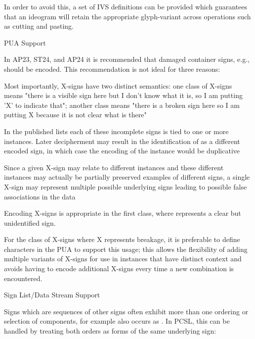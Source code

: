 \par In order to avoid this, a set of IVS definitions can be
      provided which guarantees that an ideogram will retain the
      appropriate glyph-variant across operations such as cutting and
      pasting.

\Hhhh{}PUA Support


\par In AP23, ST24, and AP24 it is recommended that damaged
      container signs, e.g.,  should be
      encoded. This recommendation is not ideal for three
      reasons:

\Hol\Hli{}Most importantly, X-signs have two distinct semantics: one
	class of X-signs means "there is a visible sign here but I
	don't know what it is, so I am putting 'X' to indicate that";
	another class means "there is a broken sign here so I am
	putting X because it is not clear what is there"

\Hli{}In the published lists each of these incomplete signs is
	tied to one or more instances. Later decipherment may result in
	the identification of  as a different
	encoded sign, in which case the encoding of the instance would
	be duplicative

\Hli{}Since a given X-sign may relate to different instances and
	these different instances may actually be partially preserved
	examples of different signs, a single X-sign may represent
	multiple possible underlying signs leading to possible false
	associations in the data

\Hendol

\par Encoding X-signs is appropriate in the first class, where
       represents a clear but unidentified sign.


\par For the class of X-signs where X represents breakage, it is
      preferable to define characters in the PUA to support this
      usage; this allows the flexibility of adding multiple variants
      of X-signs for use in instances that have distinct context and
      avoids having to encode additional X-signs every time a new
       combination is encountered.

\Hhhh{}Sign List/Data Stream Support


\par Signs which are sequences of other signs often exhibit more
      than one ordering or selection of components, for example
       also occurs as
      .  In PCSL, this can be handled by
      treating both orders as forms of the same underlying sign:

